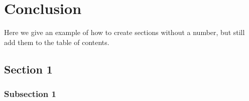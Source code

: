\chapter*{Conclusion} \label{ch:Conclusion}

Here we give an example of how to create sections without a number, but still add them to the table of contents. 

\section*{Section 1}
\blindtext[1]

\subsection*{Subsection 1}
\blindtext[1]

